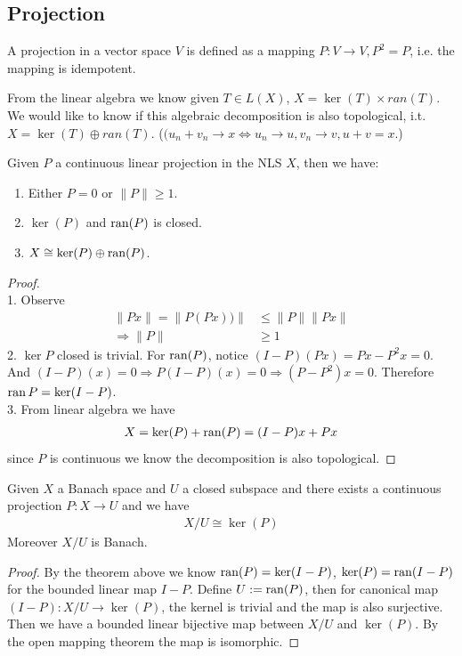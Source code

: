 \subsection{Projection}
\begin{definition}[Projection]
	A projection in a vector space $V$ is defined as a mapping $P: V \rightarrow V, P^2 = P$, i.e. the mapping is idempotent. 
\end{definition}

From the linear algebra we know given $T \in L(X)$, $X = \ker(T) \times ran(T)$. We would like to know if this algebraic decomposition is also topological, i.t. $X = \ker(T) \oplus ran(T)$. ($(u_n + v_n \rightarrow x \Leftrightarrow u_n \rightarrow u, v_n \rightarrow v, u+v = x$.)

\begin{lemma}
	Given $P$ a continuous linear projection in the NLS $X$, then we have:
	\begin{enumerate}
		\item Either $P = 0$ or $\|P\| \geq 1$.
		\item $\ker(P)$ and $\operatorname{ran}(P)$ is closed.
		\item $X \cong \ker(P) \oplus \operatorname{ran}(P)$.
	\end{enumerate}
\end{lemma}
\begin{proof}\quad\\
1. 
Observe
\begin{align*}
		\|Px\| = \|P(Px))\| &\le \|P\|\|Px\|\\
		\Rightarrow \|P\| &\geq 1
\end{align*}
2. $\ker P$ closed is trivial. For $\operatorname{ran} (P)$, notice $(I - P)(Px) = Px - P^2x = 0$. And $(I - P)(x) = 0 \Rightarrow P (I - P)(x) = 0 \Rightarrow (P - P^2)x = 0$. Therefore $\operatorname{ran} P = \ker (I - P)$.\\
3.  From linear algebra we have
\begin{align*}
	X = \ker (P) + \operatorname{ran}(P) = (I - P)x +   Px
\end{align*}
since $P$ is continuous we know the decomposition is also topological.
\end{proof}

\begin{theorem}
	Given $X$ a Banach space and $U$ a closed subspace and there exists a continuous projection $P: X \rightarrow U$ and we have
	\begin{align*}
		X \slash U \cong \ker (P)
	\end{align*}
	Moreover $X \slash U$ is Banach.
\end{theorem}
\begin{proof}
	By the theorem above we know $\operatorname{ran}(P) = \ker (I - P)$, $\ker(P) = \operatorname{ran}(I - P)$ for the bounded linear map $I - P$. Define $U := \operatorname{ran}(P)$, then for canonical map $(I- P): X\slash U \rightarrow \ker(P)$, the kernel is trivial and the map is also surjective. Then we have a bounded linear bijective map between $X\slash U$ and $\ker(P)$. By the open mapping theorem the map is isomorphic. 
\end{proof}


